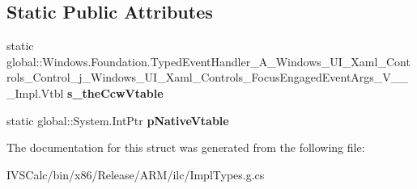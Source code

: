 \subsection*{Static Public Attributes}
\begin{DoxyCompactItemize}
\item 
\mbox{\label{struct_windows_1_1_foundation_1_1_typed_event_handler___a___windows___u_i___xaml___controls___cobd4a24aa41f7e9787f0e1d263ab457b2_a48265e006f8266e7b7d98501bf8bb9c1}} 
static global\+::\+Windows.\+Foundation.\+Typed\+Event\+Handler\+\_\+\+A\+\_\+\+Windows\+\_\+\+U\+I\+\_\+\+Xaml\+\_\+\+Controls\+\_\+\+Control\+\_\+j\+\_\+\+Windows\+\_\+\+U\+I\+\_\+\+Xaml\+\_\+\+Controls\+\_\+\+Focus\+Engaged\+Event\+Args\+\_\+\+V\+\_\+\+\_\+\+\_\+\+Impl.\+Vtbl {\bfseries s\+\_\+the\+Ccw\+Vtable}
\item 
\mbox{\label{struct_windows_1_1_foundation_1_1_typed_event_handler___a___windows___u_i___xaml___controls___cobd4a24aa41f7e9787f0e1d263ab457b2_afd3d46298aa3eabd6feb2b234afdf557}} 
static global\+::\+System.\+Int\+Ptr {\bfseries p\+Native\+Vtable}
\end{DoxyCompactItemize}


The documentation for this struct was generated from the following file\+:\begin{DoxyCompactItemize}
\item 
I\+V\+S\+Calc/bin/x86/\+Release/\+A\+R\+M/ilc/Impl\+Types.\+g.\+cs\end{DoxyCompactItemize}
